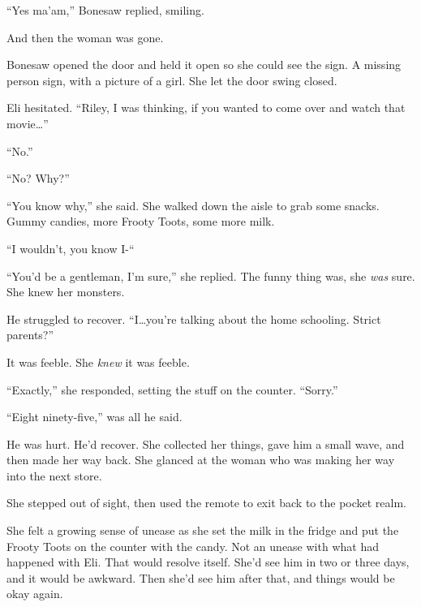``Yes ma'am,'' Bonesaw replied, smiling.



And then the woman was gone.



Bonesaw opened the door and held it open so she could see the sign.  A missing person sign, with a picture of a girl.  She let the door swing closed.



Eli hesitated.  ``Riley, I was thinking, if you wanted to come over and watch that movie\ldots''



``No.''



``No?  Why?''



``You know why,'' she said.  She walked down the aisle to grab some snacks.  Gummy candies, more Frooty Toots, some more milk.



``I wouldn't, you know I-``



``You'd be a gentleman, I'm sure,'' she replied.  The funny thing was, she \emph{was} sure.  She knew her monsters.



He struggled to recover.  ``I\ldots you're talking about the home schooling.  Strict parents?''



It was feeble.  She \emph{knew} it was feeble.



``Exactly,'' she responded, setting the stuff on the counter.  ``Sorry.''



``Eight ninety-five,'' was all he said.



He was hurt.  He'd recover.  She collected her things, gave him a small wave, and then made her way back.  She glanced at the woman who was making her way into the next store.



She stepped out of sight, then used the remote to exit back to the pocket realm.



She felt a growing sense of unease as she set the milk in the fridge and put the Frooty Toots on the counter with the candy.  Not an unease with what had happened with Eli.  That would resolve itself.  She'd see him in two or three days, and it would be awkward.  Then she'd see him after that, and things would be okay again.



